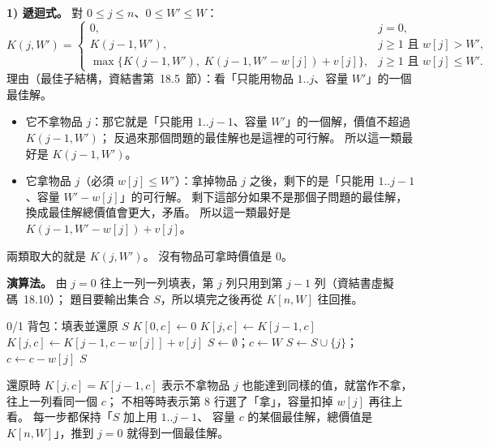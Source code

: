 \begin{pastsoln}
\textbf{1) 遞迴式。} 對 $0 \le j \le n$、$0 \le W' \le W$：
\[
K(j, W') =
\begin{cases}
0, & j = 0, \\
K(j-1, W'), & j \ge 1 \text{ 且 } w[j] > W', \\
\max\bigl\{K(j-1, W'),\; K(j-1, W' - w[j]) + v[j]\bigr\}, & j \ge 1 \text{ 且 } w[j] \le W'.
\end{cases}
\]
理由（最佳子結構，資結書第~18.5~節）：看「只能用物品 $1..j$、容量 $W'$」的一個最佳解。
\begin{itemize}
\item 它不拿物品 $j$：那它就是「只能用 $1..j-1$、容量 $W'$」的一個解，價值不超過 $K(j-1, W')$；
反過來那個問題的最佳解也是這裡的可行解。 所以這一類最好是 $K(j-1, W')$。
\item 它拿物品 $j$（必須 $w[j] \le W'$）：拿掉物品 $j$ 之後，剩下的是「只能用 $1..j-1$、容量
$W' - w[j]$」的可行解。 剩下這部分如果不是那個子問題的最佳解，換成最佳解總價值會更大，矛盾。
所以這一類最好是 $K(j-1, W' - w[j]) + v[j]$。
\end{itemize}
兩類取大的就是 $K(j, W')$。 沒有物品可拿時價值是 $0$。

\textbf{演算法。} 由 $j = 0$ 往上一列一列填表，第 $j$ 列只用到第 $j-1$ 列（資結書虛擬碼~18.10）；
題目要輸出集合 $S$，所以填完之後再從 $K[n, W]$ 往回推。
\begin{pseudo}[unbreakable]{0/1 背包：填表並還原 $S$}
        \State $K[0, c] \gets 0$
    \EndFor
            \State $K[j, c] \gets K[j - 1, c]$ 
                \State $K[j, c] \gets K[j - 1, c - w[j]] + v[j]$ 
            \EndIf
        \EndFor
    \EndFor
    \State $S \gets \emptyset$；$c \gets W$
         
            \State $S \gets S \cup \{j\}$；$c \gets c - w[j]$
        \EndIf
    \EndFor
    \State \Return $S$ 
\EndFunction
\end{pseudo}
還原時 $K[j, c] = K[j-1, c]$ 表示不拿物品 $j$ 也能達到同樣的值，就當作不拿，往上一列看同一個 $c$；
不相等時表示第 8 行選了「拿」，容量扣掉 $w[j]$ 再往上看。 每一步都保持「$S$ 加上用 $1..j-1$、
容量 $c$ 的某個最佳解，總價值是 $K[n, W]$」，推到 $j = 0$ 就得到一個最佳解。


\end{pastsoln}
